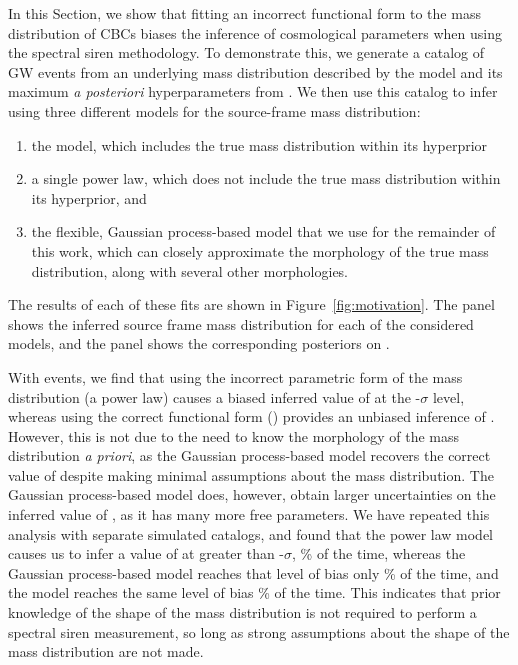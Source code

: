 \documentclass[]{aastex631}
\begin{document}
In this Section, we show that fitting an incorrect functional form to the mass distribution of CBCs biases the inference of cosmological parameters when using the spectral siren methodology.
To demonstrate this, we generate a catalog of  GW events from an underlying mass distribution described by the \plp{} model and its maximum \emph{a posteriori} hyperparameters from \citet{o3b_pop}.
We then use this catalog to infer \Ho{} using three different models for the source-frame mass distribution:
\begin{enumerate}
    \item the \plp{} model, which includes the true mass distribution within its hyperprior
    \item a single power law, which does not include the true mass distribution within its hyperprior, and 
    \item the flexible, Gaussian process-based model that we use for the remainder of this work, which can closely approximate the morphology of the true mass distribution, along with several other morphologies.
\end{enumerate}
The results of each of these fits are shown in Figure~\ref{fig:motivation}. 
The  panel shows the inferred source frame mass distribution for each of the considered models, and the  panel shows the corresponding posteriors on \Ho{}.

With  events, we find that using the incorrect parametric form of the mass distribution (a power law) causes a biased inferred value of \Ho{} at the -$\sigma$ level, whereas using the correct functional form (\plp) provides an unbiased inference of \Ho.
However, this is not due to the need to know the morphology of the mass distribution \emph{a priori}, as the Gaussian process-based model recovers the correct value of \Ho{} despite making minimal assumptions about the mass distribution.
The Gaussian process-based model does, however, obtain larger uncertainties on the inferred value of \Ho, as it has many more free parameters.
We have repeated this analysis with  separate simulated catalogs, and found that the power law model causes us to infer a  value of \Ho{} at greater than -$\sigma$, \% of the time, whereas the Gaussian process-based model reaches that level of bias only \% of the time, and the \plp{} model reaches the same level of bias \% of the time.
This indicates that prior knowledge of the shape of the mass distribution is not required to perform a spectral siren measurement, so long as strong assumptions about the shape of the mass distribution are not made.
\end{document}
